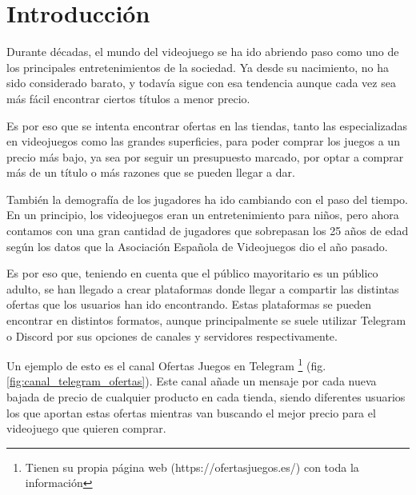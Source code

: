 \chapter{Introducción}

Durante décadas, el mundo del videojuego se ha ido abriendo paso como uno de los principales entretenimientos de la sociedad. Ya desde su nacimiento, 
no ha sido considerado barato, y todavía sigue con esa tendencia aunque cada vez sea más fácil encontrar ciertos títulos a menor precio.

Es por eso que se intenta encontrar ofertas en las tiendas, tanto las especializadas en videojuegos como las grandes superficies, para poder comprar 
los juegos a un precio más bajo, ya sea por seguir un presupuesto marcado, por optar a comprar más de un título o más razones que se pueden llegar a 
dar.

También la demografía de los jugadores ha ido cambiando con el paso del tiempo. En un principio, los videojuegos eran un entretenimiento para niños, pero 
ahora contamos con una gran cantidad de jugadores que sobrepasan los 25 años de edad según los datos que la Asociación Española de Videojuegos \cite{aevi} 
dio el año pasado.

Es por eso que, teniendo en cuenta que el público mayoritario es un público adulto, se han llegado a crear plataformas donde llegar a compartir las 
distintas ofertas que los usuarios han ido encontrando. Estas plataformas se pueden encontrar en distintos formatos, aunque principalmente se suele 
utilizar Telegram \cite{telegram} o Discord \cite{discord} por sus opciones de canales \cite{canales_telegram} y servidores \cite{servidores_discord} 
respectivamente.

Un ejemplo de esto es el canal Ofertas Juegos en Telegram \footnote{Tienen su propia página web (https://ofertasjuegos.es/) con toda la información} 
(fig. \ref{fig:canal_telegram_ofertas}). Este canal añade un mensaje por cada nueva bajada de precio de cualquier producto en cada tienda, siendo 
diferentes usuarios los que aportan estas ofertas mientras van buscando el mejor precio para el videojuego que quieren comprar.

